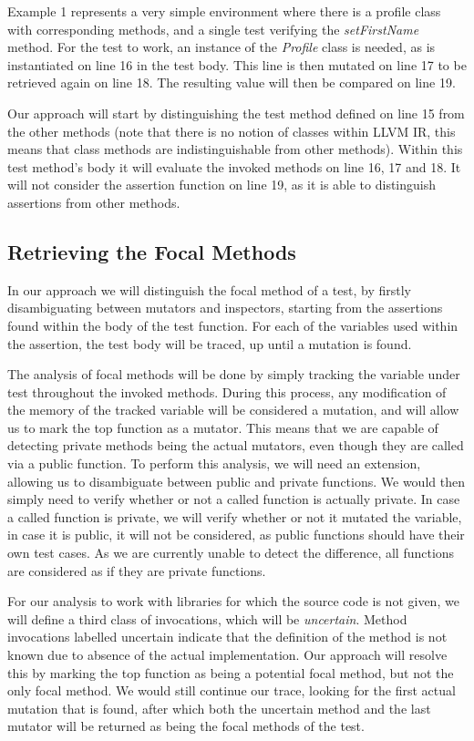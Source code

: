 \documentclass[11pt]{article}
\begin{document}
\begin{multicols}{2}
Example 1 represents a very simple environment where there is a profile class with corresponding methods, and a single test verifying the \textit{setFirstName} method. For the test to work, an instance of the \textit{Profile} class is needed, as is instantiated on line 16 in the test body. This line is then mutated on line 17 to be retrieved again on line 18. The resulting value will then be compared on line 19. 

Our approach will start by distinguishing the test method defined on line 15 from the other methods (note that there is no notion of classes within LLVM IR, this means that class methods are indistinguishable from other methods). Within this test method's body it will evaluate the invoked methods on line 16, 17 and 18. It will not consider the assertion function on line 19, as it is able to distinguish assertions from other methods.

\subsection{Retrieving the Focal Methods}
In our approach we will distinguish the focal method of a test, by firstly disambiguating between mutators and inspectors, starting from the assertions found within the body of the test function. For each of the variables used within the assertion, the test body will be traced, up until a mutation is found.

The analysis of focal methods will be done by simply tracking the variable under test throughout the invoked methods. During this process, any modification of the memory of the tracked variable will be considered a mutation, and will allow us to mark the top function as a mutator. This means that we are capable of detecting private methods being the actual mutators, even though they are called via a public function. To perform this analysis, we will need an extension, allowing us to disambiguate between public and private functions. We would then simply need to verify whether or not a called function is actually private. In case a called function is private, we will verify whether or not it mutated the variable, in case it is public, it will not be considered, as public functions should have their own test cases. As we are currently unable to detect the difference, all functions are considered as if they are private functions.

For our analysis to work with libraries for which the source code is not given, we will define a third class of invocations, which will be \textit{uncertain}. Method invocations labelled uncertain indicate that the definition of the method is not known due to absence of the actual implementation. Our approach will resolve this by marking the top function as being a potential focal method, but not the only focal method. We would still continue our trace, looking for the first actual mutation that is found, after which both the uncertain method and the last mutator will be returned as being the focal methods of the test.


\end{multicols}
\end{document}
